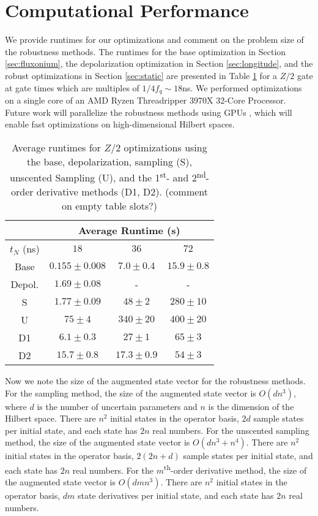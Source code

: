 \section{Computational Performance \label{appendix:time}}
We provide runtimes for our optimizations and comment on the problem size of the
robustness methods. The runtimes for
the base optimization in Section \ref{sec:fluxonium},
the depolarization optimization in Section \ref{sec:longitude},
and the robust optimizations in Section \ref{sec:static}
are presented in Table \ref{tab:time}
for a $Z/2$ gate at gate times which are multiples of $1/4f_{q} \sim 18$ns.
We performed optimizations on a single core of
an AMD Ryzen Threadripper 3970X 32-Core Processor.
Future work will parallelize the robustness methods using GPUs
\cite{leung2017speedup},
which will enable fast optimizations on high-dimensional Hilbert spaces.

\begin{table}[H]
  \centering
  \begin{tabular} {c | c | c | c }
    & \multicolumn{3}{c}{Average Runtime (s)}\\
    \hline
    $t_{N}$ (ns) & $18$ & $36$ & $72$\\
    \hline
    Base & $0.155 \pm 0.008$ & $7.0 \pm 0.4$ & $15.9 \pm 0.8$\\
    Depol. & $1.69 \pm 0.08$ & - & -\\
    S & $1.77 \pm 0.09$ & $48 \pm 2$ & $280 \pm 10$\\
    U & $75 \pm 4$ & $340 \pm 20$ & $400 \pm 20$\\
    D1 & $6.1 \pm 0.3$ & $27 \pm 1$ & $65 \pm 3$\\
    D2 & $15.7 \pm 0.8$ & $17.3 \pm 0.9$ & $54 \pm 3$\\
  \end{tabular}
  \caption{
    Average runtimes for $Z/2$ optimizations
    using the base, depolarization, sampling (S),
    unscented Sampling (U), and the 1\textsuperscript{st}-
    and 2\textsuperscript{nd}-order derivative methods (D1, D2). (comment on empty table slots?)
  }
  \label{tab:time}
\end{table}

Now we note the size of the augmented state vector for the robustness methods.
For the sampling method, the size of the augmented state vector
is $O(dn^{3})$, where $d$ is the number of uncertain parameters and
$n$ is the dimension of the Hilbert space. There are $n^{2}$ initial states
in the operator basis, $2d$ sample states per initial state,
and each state has $2n$ real numbers.
For the unscented sampling method, the size of the augmented state vector
is $O(dn^{3} + n^{4})$.
There are $n^{2}$ initial states in the operator basis,
$2(2n + d)$ sample states per initial state,
and each state has $2n$ real numbers.
For the $m$\textsuperscript{th}-order derivative method, the size of the augmented state vector
is $O(dmn^{3})$. There are $n^{2}$
initial states in the operator basis, $dm$ state derivatives per initial state,
and each state has $2n$ real numbers. 
